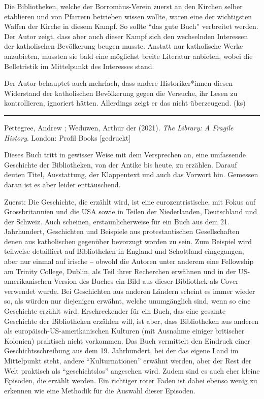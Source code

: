 \documentclass[a4paper,
fontsize=11pt,
oneside,
numbers=noperiodatend,
parskip=half-,
bibliography=totoc,
final
]{scrartcl}
\begin{document}
Die Bibliotheken, welche der Borromäus-Verein zuerst an den Kirchen
selber etablieren und von Pfarrern betrieben wissen wollte, waren eine
der wichtigsten Waffen der Kirche in diesem Kampf. So sollte
\enquote{das gute Buch} verbreitet werden. Der Autor zeigt, dass aber
auch dieser Kampf sich den wechselnden Interessen der katholischen
Bevölkerung beugen musste. Anstatt nur katholische Werke anzubieten,
mussten sie bald eine möglichst breite Literatur anbieten, wobei die
Belletristik im Mittelpunkt des Interesses stand.

Der Autor behauptet auch mehrfach, dass andere Historiker*innen diesen
Widerstand der katholischen Bevölkerung gegen die Versuche, ihr Lesen zu
kontrollieren, ignoriert hätten. Allerdings zeigt er das nicht
überzeugend. (ks)

\begin{center}\rule{0.5\linewidth}{0.5pt}\end{center}

Pettegree, Andrew ; Weduwen, Arthur der (2021). \emph{The Library: A
Fragile History}. London: Profil Books {[}gedruckt{]}

Dieses Buch tritt in gewisser Weise mit dem Versprechen an, eine
umfassende Geschichte der Bibliotheken, von der Antike bis heute, zu
erzählen. Darauf deuten Titel, Ausstattung, der Klappentext und auch das
Vorwort hin. Gemessen daran ist es aber leider enttäuschend.

Zuerst: Die Geschichte, die erzählt wird, ist eine eurozentristische,
mit Fokus auf Grossbritannien und die USA sowie in Teilen der
Niederlanden, Deutschland und der Schweiz. Auch scheinen,
erstaunlicherweise für ein Buch aus dem 21. Jahrhundert, Geschichten und
Beispiele aus protestantischen Gesellschaften denen aus katholischen
gegenüber bevorzugt worden zu sein. Zum Beispiel wird teilweise
detailliert auf Bibliotheken in England und Schottland eingegangen, aber
nur einmal auf irische ‒ obwohl die Autoren unter anderem eine
Fellowship am Trinity College, Dublin, als Teil ihrer Recherchen
erwähnen und in der US-amerikanischen Version des Buches ein Bild aus
dieser Bibliothek als Cover verwendet wurde. Bei Geschichten aus anderen
Ländern scheint es immer wieder so, als würden nur diejenigen erwähnt,
welche unumgänglich sind, wenn so eine Geschichte erzählt wird.
Erschreckender für ein Buch, das eine gesamte Geschichte der
Bibliotheken erzählen will, ist aber, dass Bibliotheken aus anderen als
europäisch-US-amerikanischen Kulturen (mit Ausnahme einiger britischer
Kolonien) praktisch nicht vorkommen. Das Buch vermittelt den Eindruck
einer Geschichtsschreibung aus dem 19. Jahrhundert, bei der das eigene
Land im Mittelpunkt steht, andere \enquote{Kulturnationen} erwähnt
werden, aber der Rest der Welt praktisch als \enquote{geschichtslos}
angesehen wird. Zudem sind es auch eher kleine Episoden, die erzählt
werden. Ein richtiger roter Faden ist dabei ebenso wenig zu erkennen wie
eine Methodik für die Auswahl dieser Episoden.
\end{document}
